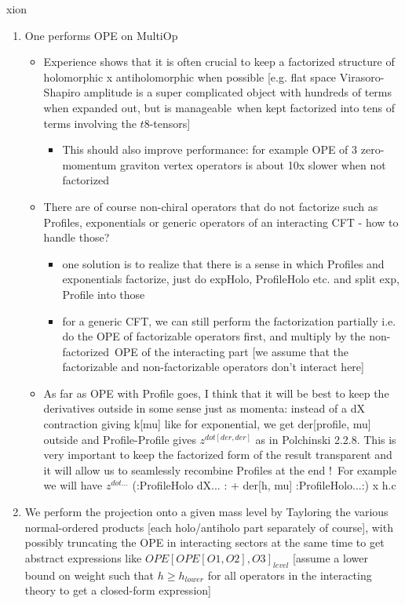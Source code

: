 xion\documentclass[12pt]{article}
\numberwithin{equation}{section}
\begin{document}
\begin{enumerate}

\item One performs OPE on MultiOp
	\begin{itemize}
		\item
	Experience shows that it is often crucial to keep a factorized structure of holomorphic x antiholomorphic when possible [e.g. flat space Virasoro-Shapiro amplitude is a super complicated object with hundreds of terms when expanded out, but is manageable when kept factorized into tens of terms involving the $t8$-tensors]
	\begin{itemize}
		\item This should also improve performance: for example OPE of 3 zero-momentum graviton vertex operators is about 10x slower when not factorized
	\end{itemize}
\item There are of course non-chiral operators that do not factorize such as Profiles, exponentials or generic operators of an interacting CFT - how to handle those?
	\begin{itemize}
	\item one solution is to realize that there is a sense in which Profiles and exponentials factorize, just do expHolo, ProfileHolo etc. and split exp, Profile into those
	\item for a generic CFT, we can still perform the factorization partially i.e. do the OPE of factorizable operators first, and multiply by the non-factorized OPE of the interacting part [we assume that the factorizable and non-factorizable operators don't interact here]
\end{itemize}
	\item As far as OPE with Profile goes, I think that it will be best to keep the derivatives outside in some sense just as momenta: instead of a dX contraction giving k[mu] like for exponential, we get der[profile, mu] outside and Profile-Profile gives $z^{dot[der,der]}$ as in Polchinski 2.2.8. This is very important to keep the factorized form of the result transparent and it will allow us to seamlessly recombine Profiles at the end ! For example we will have $z^{dot...}$ (:ProfileHolo dX... : + der[h, mu] :ProfileHolo...:) x h.c
\end{itemize}
\item We perform the projection onto a given mass level by Tayloring the various normal-ordered products [each holo/antiholo part separately of course], with possibly truncating the OPE in interacting sectors at the same time to get abstract expressions like $OPE[OPE[O1, O2], O3]_{level}$ [assume a lower bound on weight such that $h \geq h_{lower}$ for all operators in the interacting theory to get a closed-form expression]

\end{enumerate}
\end{document}
